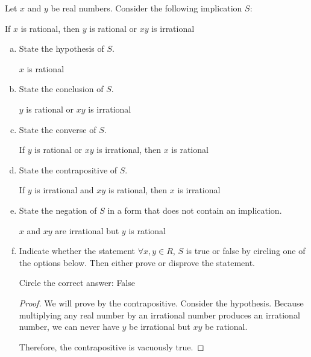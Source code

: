 \documentclass{agony}
\begin{document}
\question Let $x$ and $y$ be real numbers. Consider the following implication $S$:
\begin{center}
  If $x$ is rational, then $y$ is rational or $xy$ is irrational
\end{center}
\begin{enumerate}[(a)]
  \item State the hypothesis of $S$. \begin{center}
          $x$ is rational
        \end{center}
  \item State the conclusion of $S$. \begin{center}
          $y$ is rational or $xy$ is irrational
        \end{center}
  \item State the converse of $S$. \begin{center}
          If $y$ is rational or $xy$ is irrational, then $x$ is rational
        \end{center}
  \item State the contrapositive of $S$. \begin{center}
          If $y$ is irrational and $xy$ is rational, then $x$ is irrational
        \end{center}
  \item State the negation of $S$ in a form that does not contain an implication. \begin{center}
          $x$ and $xy$ are irrational but $y$ is rational
        \end{center}
  \item Indicate whether the statement $\forall x, y \in R$,
        $S$ is true or false by circling one of the options below.
        Then either prove or disprove the statement.

        Circle the correct answer: \quad {} \quad False
        \begin{proof}
          We will prove by the contrapositive.
          Consider the hypothesis.
          Because multiplying any real number by an irrational number produces an irrational number,
          we can never have $y$ be irrational but $xy$ be rational.

          Therefore, the contrapositive is vacuously true.
        \end{proof}
\end{enumerate}
\end{document}
